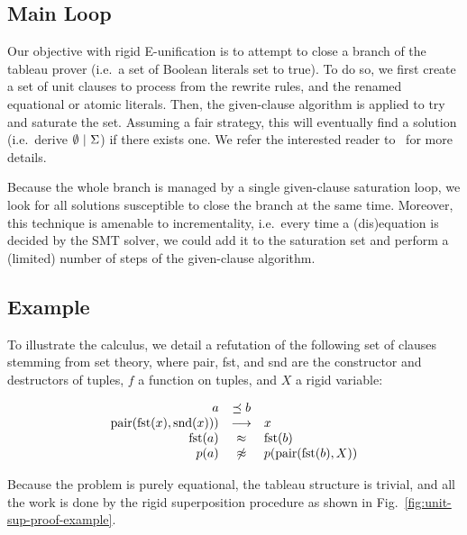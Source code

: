 \subsection{Main Loop}

Our objective with rigid E-unification is to attempt to close a branch of the
tableau prover (i.e.~a set of Boolean literals set to true). To do so, we first
create a set of unit clauses to process from the rewrite rules, and the renamed
equational or atomic literals. Then, the given-clause algorithm is applied to try and
saturate the set. Assuming a fair strategy, this will eventually find a
solution (i.e.~derive $\emptyset ~|~ \Sigma$) if there exists
one. We refer the interested reader to~\cite{SS02} for more details.

Because the whole branch is managed by a single given-clause saturation loop, we
look for all solutions susceptible to close the branch at the same time.
Moreover, this technique is amenable to incrementality, i.e.~every time a
(dis)equation is decided by the SMT solver, we could add it to the saturation
set and perform a (limited) number of steps of the given-clause algorithm.

\subsection{Example}

To illustrate the calculus, we detail a refutation of the following set of
clauses stemming from set theory, where pair, fst, and snd are the constructor
and destructors of tuples, $f$ a function on tuples, and $X$ a rigid variable:

\[\begin{array}{rcl}
a &\preceq b \\
\text{pair}(\text{fst}(x), \text{snd}(x))) &\longrightarrow& x\\
\text{fst}(a) &\approx& \text{fst}(b)\\
p(a) &\not\approx& p(\text{pair}(\text{fst}(b), X))\\
\end{array}\]

Because the problem is purely equational, the tableau structure is trivial, and
all the work is done by the rigid superposition procedure as shown in
Fig.~\ref{fig:unit-sup-proof-example}.

